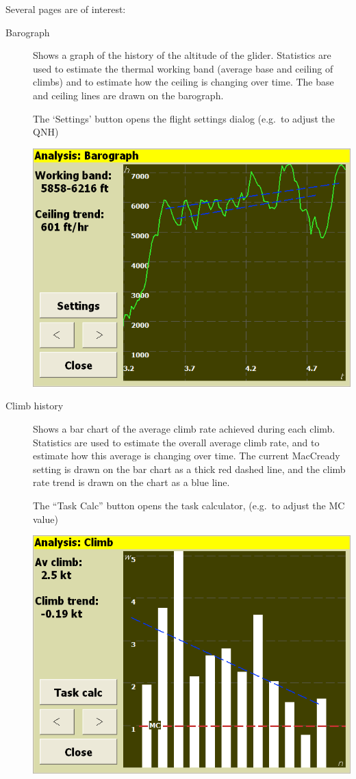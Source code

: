 \documentclass[a4paper,12pt]{refrep}
\begin{document}
Several pages are of interest:
\begin{description}
\item[Barograph]  Shows a graph of the history of the altitude of the glider.
  Statistics are used to estimate the thermal working band (average
  base and ceiling of climbs) and to estimate how the ceiling is
  changing over time.  The base and ceiling lines are drawn on the
  barograph.

  The `Settings' button opens the flight settings dialog
  (e.g.\ to adjust the QNH)

\begin{center}
\includegraphics[angle=0,width=0.8\linewidth,keepaspectratio='true']{figures/analysis-barograph.png}
\end{center}

\item[Climb history]
  Shows a bar chart of the average climb rate achieved during each
  climb.  Statistics are used to estimate the overall average climb
  rate, and to estimate how this average is changing over time.  The
  current MacCready setting is drawn on the bar chart as a thick red
  dashed line, and the climb rate trend is drawn on the chart as a
  blue line.

  The ``Task Calc'' button opens the task calculator,
  (e.g.\ to adjust the MC value)

\begin{center}
\includegraphics[angle=0,width=0.8\linewidth,keepaspectratio='true']{figures/analysis-climb.png}
\end{center}


\end{description}
\end{document}
